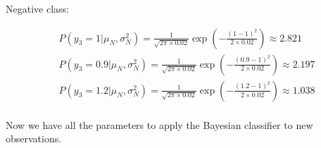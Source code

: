 \documentclass[12pt]{article}
\begin{document}
\begin{enumerate}[leftmargin=\labelsep]
    \vspace{10pt}
    Negative class:
    
    \begin{equation*}
        \begin{aligned}
            &P(y_3 = 1|\mu_N, \sigma_N^2) = \frac{1}{\sqrt{2\pi \times 0.02}} \exp\left(-\frac{(1 - 1)^2}{2 \times 0.02}\right) \approx 2.821 \\
            &P(y_3 = 0.9|\mu_N, \sigma_N^2) = \frac{1}{\sqrt{2\pi \times 0.02}} \exp\left(-\frac{(0.9 - 1)^2}{2 \times 0.02}\right) \approx 2.197 \\
            &P(y_3 = 1.2|\mu_N, \sigma_N^2) = \frac{1}{\sqrt{2\pi \times 0.02}} \exp\left(-\frac{(1.2 - 1)^2}{2 \times 0.02}\right) \approx 1.038\\
        \end{aligned}
    \end{equation*}

    \vspace{10pt}
    Now we have all the parameters to apply the Bayesian classifier to new observations.



\end{enumerate}
\end{document}
